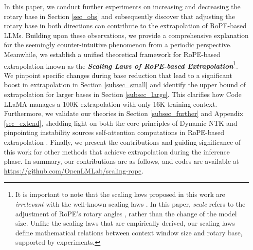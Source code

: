 In this paper, we conduct further experiments on increasing and decreasing the rotary base in Section \ref{sec_obs} and subsequently discover that adjusting the rotary base in both directions can contribute to the extrapolation of RoPE-based LLMs. Building upon these observations, we provide a comprehensive explanation for the seemingly counter-intuitive phenomenon from a periodic perspective. Meanwhile, we establish a unified theoretical framework for RoPE-based extrapolation known as the \textit{\textbf{Scaling Laws of RoPE-based Extrapolation}}\footnote{It is important to note that the scaling laws proposed in this work are \textit{irrelevant} with the well-known scaling laws \citep{kaplan2020scaling}. In this paper, \textit{scale} refers to the adjustment of RoPE's rotary angles \citep{dynamicNTK}, rather than the change of the model size. Unlike the scaling laws \citep{kaplan2020scaling} that are empirically derived, our scaling laws define mathematical relations between context window size and rotary base, supported by experiments.}. We pinpoint specific changes during base reduction that lead to a significant boost in extrapolation in Section \ref{subsec_small} and identify the upper bound of extrapolation for larger bases in Section \ref{subsec_large}. This clarifies how Code LLaMA \citep{roziere2023code} manages a 100K extrapolation with only 16K training context. Furthermore, we validate our theories in Section \ref{subsec_further} and Appendix \ref{sec_extend}, shedding light on both the core principles of Dynamic NTK \citep{dynamicNTK} and pinpointing instability sources self-attention computations in RoPE-based extrapolation \citep{han2023lm}. Finally, we present the contributions and guiding significance of this work for other methods that achieve extrapolation during the inference phase. In summary, our contributions are as follows, and codes are available at \url{https://github.com/OpenLMLab/scaling-rope}.

